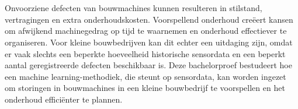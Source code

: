 
%
%
%
%
%

%



\chapter*{}

Onvoorziene defecten van bouwmachines kunnen resulteren in stilstand, vertragingen en extra onderhoudskosten. Voorspellend onderhoud creëert kansen om afwijkend machinegedrag op tijd te waarnemen en onderhoud effectiever te organiseren. Voor kleine bouwbedrijven kan dit echter een uitdaging zijn, omdat er vaak slechts een beperkte hoeveelheid historische sensordata en een beperkt aantal geregistreerde defecten beschikbaar is. Deze bachelorproef bestudeert hoe een machine learning-methodiek, die steunt op sensordata, kan worden ingezet om storingen in bouwmachines in een kleine bouwbedrijf te voorspellen en het onderhoud efficiënter te plannen.

